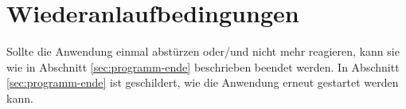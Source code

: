 \documentclass[
  a4paper,
  10pt
]{scrreprt}
\begin{document}

\section{Wiederanlaufbedingungen}
\label{sec:wiederanlaufbedingungen}

Sollte die Anwendung einmal abstürzen oder/und nicht mehr reagieren, kann sie wie in Abschnitt \ref{sec:programm-ende} beschrieben beendet werden.
In Abschnitt \ref{sec:programm-ende} ist geschildert, wie die Anwendung erneut gestartet werden kann.








\end{document}
